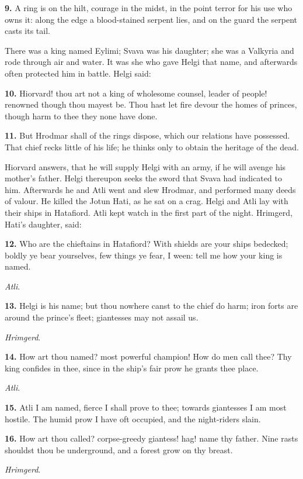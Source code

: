 \textbf{9.} A ring is on the hilt, courage in the midst, in the point terror
for his use who owns it: along the edge a blood-stained serpent lies,
and on the guard the serpent casts its tail.

There was a king named Eylimi; Svava was his daughter; she was a
Valkyria and rode through air and water. It was she who gave Helgi
that name, and afterwards often protected him in battle. Helgi said:

\textbf{10.} Hiorvard! thou art not a king of wholesome counsel, leader of
people! renowned though thou mayest be. Thou hast let fire devour the
homes of princes, though harm to thee they none have done.

\textbf{11.} But Hrodmar shall of the rings dispose, which our relations have
possessed. That chief recks little of his life; he thinks only to
obtain the heritage of the dead.

Hiorvard answers, that he will supply Helgi with an army, if he will
avenge his mother's father. Helgi thereupon seeks the sword that Svava
had indicated to him. Afterwards he and Atli went and slew Hrodmar,
and performed many deeds of valour. He killed the Jotun Hati, as he
sat on a crag. Helgi and Atli lay with their ships in Hatafiord. Atli
kept watch in the first part of the night. Hrimgerd, Hati's daughter,
said:

\textbf{12.} Who are the chieftains in Hatafiord? With shields are your ships
bedecked; boldly ye bear yourselves, few things ye fear, I ween: tell
me how your king is named.

\emph{Atli}.

\textbf{13.} Helgi is his name; but thou nowhere canst to the chief do harm;
iron forts are around the prince's fleet; giantesses may not assail
us.

\emph{Hrimgerd}.

\textbf{14.} How art thou named? most powerful champion! How do men call
thee? Thy king confides in thee, since in the ship's fair prow he
grants thee place.

\emph{Atli}.

\textbf{15.} Atli I am named, fierce I shall prove to thee; towards
giantesses I am most hostile. The humid prow I have oft occupied, and
the night-riders slain.

\textbf{16.} How art thou called? corpse-greedy giantess! hag! name thy
father. Nine rasts shouldst thou be underground, and a forest grow on
thy breast.

\emph{Hrimgerd}.

